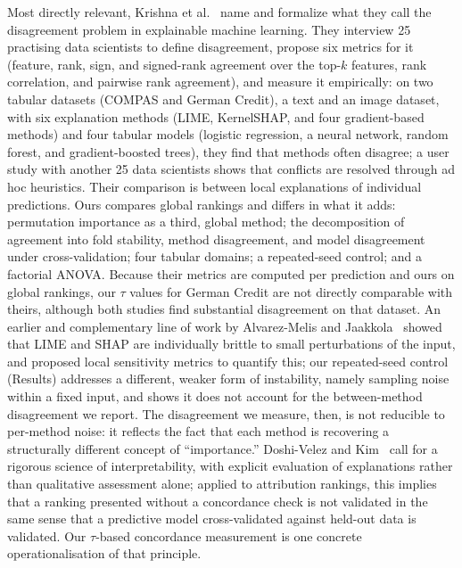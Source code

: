 \documentclass[11pt,twoside,a4paper]{article}
\begin{document}
Most directly relevant, Krishna et al.~\citep{krishna2024disagreement} name and formalize what they call the disagreement problem in explainable machine learning. They interview 25 practising data scientists to define disagreement, propose six metrics for it (feature, rank, sign, and signed-rank agreement over the top-$k$ features, rank correlation, and pairwise rank agreement), and measure it empirically: on two tabular datasets (COMPAS and German Credit), a text and an image dataset, with six explanation methods (LIME, KernelSHAP, and four gradient-based methods) and four tabular models (logistic regression, a neural network, random forest, and gradient-boosted trees), they find that methods often disagree; a user study with another 25 data scientists shows that conflicts are resolved through ad hoc heuristics. Their comparison is between local explanations of individual predictions. Ours compares global rankings and differs in what it adds: permutation importance as a third, global method; the decomposition of agreement into fold stability, method disagreement, and model disagreement under cross-validation; four tabular domains; a repeated-seed control; and a factorial ANOVA. Because their metrics are computed per prediction and ours on global rankings, our $\tau$ values for German Credit are not directly comparable with theirs, although both studies find substantial disagreement on that dataset. An earlier and complementary line of work by Alvarez-Melis and Jaakkola~\citep{alvarezmelis2018robustness} showed that LIME and SHAP are individually brittle to small perturbations of the input, and proposed local sensitivity metrics to quantify this; our repeated-seed control (Results) addresses a different, weaker form of instability, namely sampling noise within a fixed input, and shows it does not account for the between-method disagreement we report. The disagreement we measure, then, is not reducible to per-method noise: it reflects the fact that each method is recovering a structurally different concept of ``importance.'' Doshi-Velez and Kim~\citep{doshivelez2017rigorous} call for a rigorous science of interpretability, with explicit evaluation of explanations rather than qualitative assessment alone; applied to attribution rankings, this implies that a ranking presented without a concordance check is not validated in the same sense that a predictive model cross-validated against held-out data is validated. Our $\tau$-based concordance measurement is one concrete operationalisation of that principle.
\end{document}
